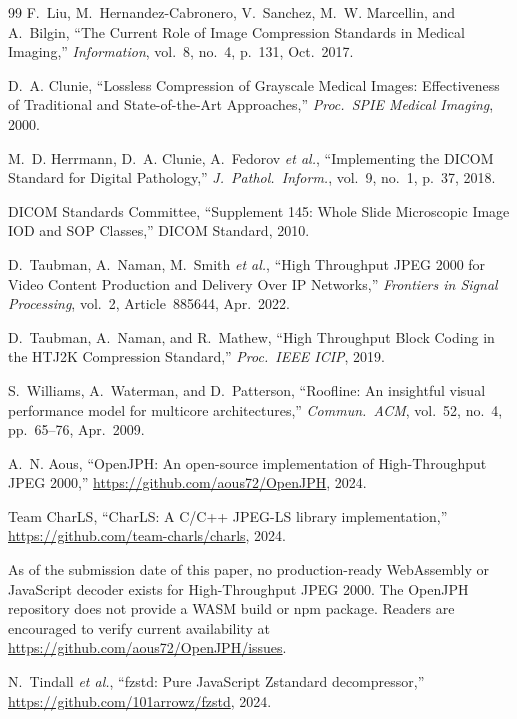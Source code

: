 \documentclass[10pt,twocolumn]{article}
\begin{document}
\begin{thebibliography}{99}
F.~Liu, M.~Hernandez-Cabronero, V.~Sanchez, M.~W. Marcellin, and A.~Bilgin,
``The Current Role of Image Compression Standards in Medical Imaging,''
\textit{Information}, vol.~8, no.~4, p.~131, Oct.~2017.

D.~A. Clunie, ``Lossless Compression of Grayscale Medical Images:
Effectiveness of Traditional and State-of-the-Art Approaches,'' \textit{Proc.\
SPIE Medical Imaging}, 2000.

M.~D. Herrmann, D.~A. Clunie, A.~Fedorov \textit{et al.}, ``Implementing the
DICOM Standard for Digital Pathology,'' \textit{J.~Pathol.\ Inform.}, vol.~9,
no.~1, p.~37, 2018.

DICOM Standards Committee, ``Supplement 145: Whole Slide Microscopic Image IOD
and SOP Classes,'' DICOM Standard, 2010.

D.~Taubman, A.~Naman, M.~Smith \textit{et al.}, ``High Throughput JPEG 2000
for Video Content Production and Delivery Over IP Networks,''
\textit{Frontiers in Signal Processing}, vol.~2, Article~885644, Apr.~2022.

D.~Taubman, A.~Naman, and R.~Mathew, ``High Throughput Block Coding in the
HTJ2K Compression Standard,'' \textit{Proc.\ IEEE ICIP}, 2019.

S.~Williams, A.~Waterman, and D.~Patterson, ``Roofline: An insightful visual
performance model for multicore architectures,'' \textit{Commun.\ ACM},
vol.~52, no.~4, pp.~65--76, Apr.~2009.

A.~N. Aous, ``OpenJPH: An open-source implementation of High-Throughput JPEG
2000,'' \url{https://github.com/aous72/OpenJPH}, 2024.

Team CharLS, ``CharLS: A C/C++ JPEG-LS library implementation,''
\url{https://github.com/team-charls/charls}, 2024.

As of the submission date of this paper, no production-ready WebAssembly or
JavaScript decoder exists for High-Throughput JPEG 2000. The OpenJPH repository
does not provide a WASM build or npm package. Readers are encouraged to verify
current availability at \url{https://github.com/aous72/OpenJPH/issues}.

N.~Tindall \textit{et al.}, ``fzstd: Pure JavaScript Zstandard decompressor,''
\url{https://github.com/101arrowz/fzstd}, 2024.

\end{thebibliography}
\end{document}
